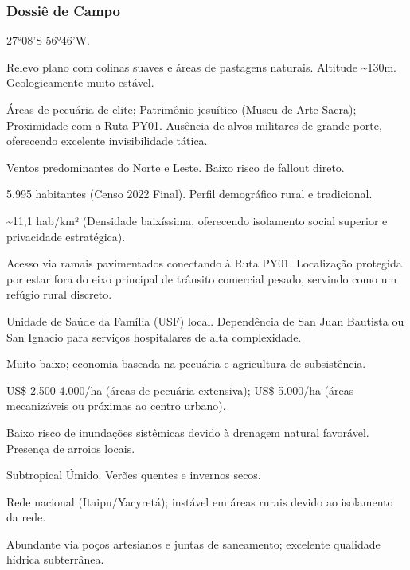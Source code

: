 \subsubsection{Dossiê de Campo}
\begin{description}[style=nextline,leftmargin=0.5cm,font=\bfseries]
\item[Coordenadas]  27°08'S 56°46'W.
\item[Topografia]  Relevo plano com colinas suaves e áreas de pastagens naturais. Altitude \textasciitilde 130m. Geologicamente muito estável.
\item[Alvos Estratégicos]  Áreas de pecuária de elite; Patrimônio jesuítico (Museu de Arte Sacra); Proximidade com a Ruta PY01. Ausência de alvos militares de grande porte, oferecendo excelente invisibilidade tática.
\item[Fallout]  Ventos predominantes do Norte e Leste. Baixo risco de fallout direto.
\item[População]  5.995 habitantes (Censo 2022 Final). Perfil demográfico rural e tradicional.
\item[Densidade]  \textasciitilde 11,1 hab/\allowbreak km² (Densidade baixíssima, oferecendo isolamento social superior e privacidade estratégica).
\item[Vias de Acesso]  Acesso via ramais pavimentados conectando à Ruta PY01. Localização protegida por estar fora do eixo principal de trânsito comercial pesado, servindo como um refúgio rural discreto.
\item[Serviços]  Unidade de Saúde da Família (USF) local. Dependência de San Juan Bautista ou San Ignacio para serviços hospitalares de alta complexidade.
\item[Custo de Vida]  Muito baixo; economia baseada na pecuária e agricultura de subsistência.
\item[Preço da Terra]  US\$ 2.500-4.000/\allowbreak ha (áreas de pecuária extensiva); US\$ 5.000/\allowbreak ha (áreas mecanizáveis ou próximas ao centro urbano).
\item[Hidrologia]  Baixo risco de inundações sistêmicas devido à drenagem natural favorável. Presença de arroios locais.
\item[Clima]  Subtropical Úmido. Verões quentes e invernos secos.
\item[Energia]  Rede nacional (Itaipu/\allowbreak Yacyretá); instável em áreas rurais devido ao isolamento da rede.
\item[Água]  Abundante via poços artesianos e juntas de saneamento; excelente qualidade hídrica subterrânea.

\end{description}
